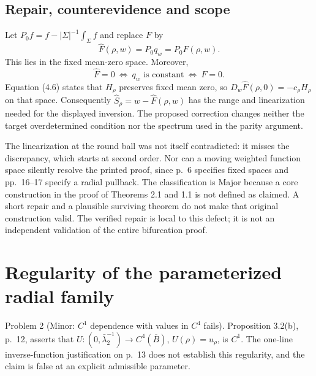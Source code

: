 \documentclass[10pt]{article}
\begin{document}
\subsection*{Repair, counterevidence and scope}
Let \(P_0f=f-|\Sigma|^{-1}\int_\Sigma f\) and replace \(F\) by \[\widehat F(\rho,w)=P_0q_w=P_0F(\rho,w).\] This lies in the fixed mean-zero space. Moreover, \[\widehat F=0\ \Longleftrightarrow\ q_w\text{ is constant}
 \ \Longleftrightarrow\ F=0.\] Equation (4.6) states that \(H_\rho\) preserves fixed mean zero, so \(D_w\widehat F(\rho,0)=-c_\rho H_\rho\) on that space. Consequently \(\widehat S_\rho=w-\widehat F(\rho,w)\) has the range and linearization needed for the displayed inversion. The proposed correction changes neither the target overdetermined condition nor the spectrum used in the parity argument.\par
The linearization at the round ball was not itself contradicted: it misses the discrepancy, which starts at second order. Nor can a moving weighted function space silently resolve the printed proof, since p. 6 specifies fixed spaces and pp. 16–17 specify a radial pullback. The classification is Major because a core construction in the proof of Theorems 2.1 and 1.1 is not defined as claimed. A short repair and a plausible surviving theorem do not make that original construction valid. The verified repair is local to this defect; it is not an independent validation of the entire bifurcation proof.\par
\section*{Regularity of the parameterized radial family}
Problem 2 (Minor: \(C^1\) dependence with values in \(C^4\) fails).  Proposition 3.2(b), p. 12, asserts that \(U:(0,\bar\lambda_2^{-1})\to C^4(\overline B)\), \(U(\rho)=u_\rho\), is \(C^1\). The one-line inverse-function justification on p. 13 does not establish this regularity, and the claim is false at an explicit admissible parameter.\par
\end{document}
